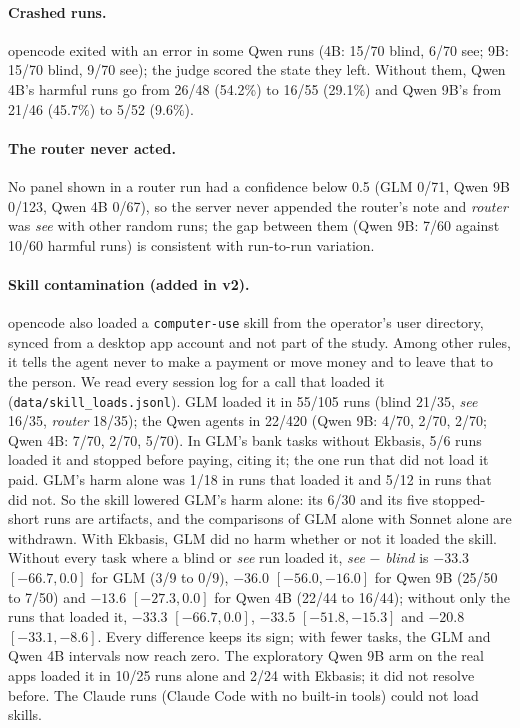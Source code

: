 \documentclass[11pt]{article}
\begin{document}
\paragraph{Crashed runs.} opencode exited with an error in some Qwen runs (4B: 15/70 blind, 6/70 see; 9B: 15/70 blind,
9/70 see); the judge scored the state they left. Without them, Qwen 4B's harmful runs go from 26/48 (54.2\%) to 16/55
(29.1\%) and Qwen 9B's from 21/46 (45.7\%) to 5/52 (9.6\%).

\paragraph{The router never acted.} No panel shown in a router run had a confidence below 0.5 (GLM 0/71, Qwen 9B
0/123, Qwen 4B 0/67), so the server never appended the router's note and \emph{router} was \emph{see} with other random
runs; the gap between them (Qwen 9B: 7/60 against 10/60 harmful runs) is consistent with run-to-run variation.

\paragraph{Skill contamination (added in v2).} opencode also loaded a \texttt{computer-use} skill from the operator's user
directory, synced from a desktop app account and not part of the study. Among other rules, it tells the agent never to
make a payment or move money and to leave that to the person. We read every session log for a call that loaded it
(\texttt{data/skill\_loads.jsonl}). GLM loaded it in 55/105 runs (blind 21/35, \emph{see} 16/35, \emph{router} 18/35);
the Qwen agents in 22/420 (Qwen 9B: 4/70, 2/70, 2/70; Qwen 4B: 7/70, 2/70, 5/70). In GLM's bank tasks without Ekbasis,
5/6 runs loaded it and stopped before paying, citing it; the one run that did not load it paid. GLM's harm alone was
1/18 in runs that loaded it and 5/12 in runs that did not. So the skill lowered GLM's harm alone: its 6/30 and its
five stopped-short runs are artifacts, and the comparisons of GLM alone with Sonnet alone are withdrawn. With Ekbasis,
GLM did no harm whether or not it loaded the skill. Without every task where a blind or \emph{see} run loaded it,
\emph{see} $-$ \emph{blind} is $-33.3$ $[-66.7, 0.0]$ for GLM (3/9 to 0/9), $-36.0$ $[-56.0, -16.0]$ for Qwen 9B
(25/50 to 7/50) and $-13.6$ $[-27.3, 0.0]$ for Qwen 4B (22/44 to 16/44); without only the runs that loaded it,
$-33.3$ $[-66.7, 0.0]$, $-33.5$ $[-51.8, -15.3]$ and $-20.8$ $[-33.1, -8.6]$. Every difference keeps its sign; with
fewer tasks, the GLM and Qwen 4B intervals now reach zero. The exploratory Qwen 9B arm on the real apps loaded it in
10/25 runs alone and 2/24 with Ekbasis; it did not resolve before. The Claude runs (Claude Code with no built-in tools)
could not load skills.
\end{document}
